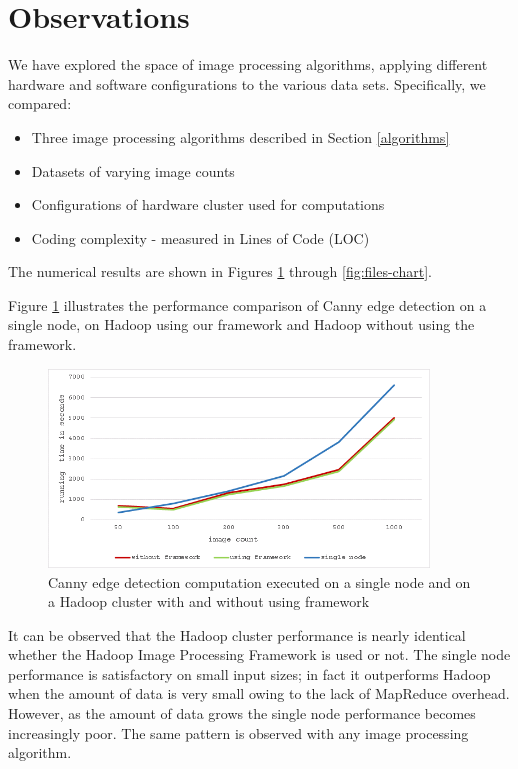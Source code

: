 \documentclass{osuthesis}
\begin{document}
				\section{Observations}   
				
				We have explored the space of image processing algorithms, applying
				different hardware and software configurations to the various data
				sets.  Specifically, we compared:
				
				\begin{itemize}
					\item Three image processing algorithms described in Section
					\ref{algorithms}
					\item Datasets of varying image counts
					\item Configurations of hardware cluster used for computations 
					\item Coding complexity - measured in Lines of Code (LOC)
				\end{itemize}
				
				The numerical results are shown in Figures \ref{fig:perf-chart}
				through \ref{fig:files-chart}.
				
				Figure \ref{fig:perf-chart} illustrates the performance comparison of
				Canny edge detection on a single node, on Hadoop using our framework
				and Hadoop without using the framework.
				
				\begin{figure}[h]
					\centering
					\includegraphics[width=0.90\textwidth]{perf-graph}
					\caption{Canny edge detection computation executed on a single node
						and on a Hadoop cluster with and without using framework}
					\label{fig:perf-chart}
				\end{figure}
				
				It can be observed that the Hadoop cluster performance is nearly
				identical whether the Hadoop Image Processing Framework is used or
				not.  The single node performance is satisfactory on small input
				sizes; in fact it outperforms Hadoop when the amount of data is very
				small owing to the lack of MapReduce overhead.  However, as the amount
				of data grows the single node performance becomes increasingly poor.
				The same pattern is observed with any image processing algorithm.
				
\end{document}
